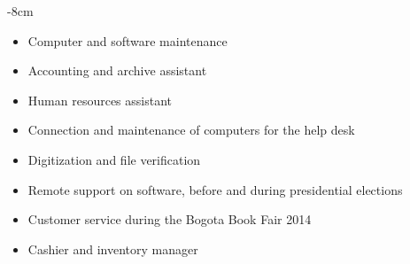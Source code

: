 \documentclass[10pt,a4paper]{altacv}
\begin{document}

\begin{adjustwidth}{}{-8cm}
\makecvheader
\end{adjustwidth}


\begin{itemize}
		\item Computer and software maintenance 
        \item Accounting and archive assistant
        \item Human resources assistant
\end{itemize}

\divider

\begin{itemize}
 \item Connection and maintenance of computers for the help desk
        \item Digitization and file verification
        \item Remote support on software, before and during presidential elections 
\end{itemize}

\divider

\begin{itemize}
 \item Customer service during the Bogota Book Fair 2014
  \item Cashier and inventory manager
\end{itemize}
\end{document}

